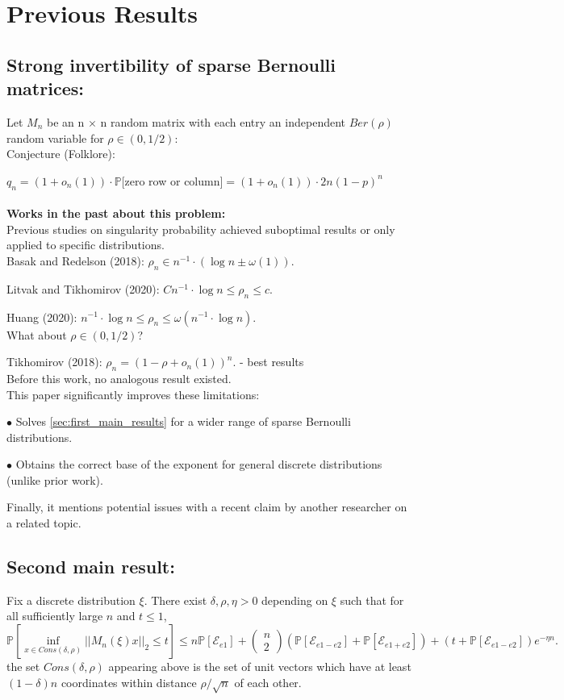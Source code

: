 \documentclass{article}
\begin{document}
\section{Previous Results}
\subsection{Strong invertibility of sparse Bernoulli matrices:}
Let ${M_n}$ be an n $\times$ n random matrix with each entry an independent $Ber(\rho)$ random variable for $\rho \in (0, 1/2)$: \\
Conjecture (Folklore):

$q_n = (1 + o_n(1)) \cdot \mathbb{P}[$zero row or column$] = (1 + o_n(1)) \cdot 2n(1-p)^n$ \\
\\\textbf{Works in the past about this problem:} \\
Previous studies on singularity probability achieved suboptimal results or only applied to specific distributions.\\

Basak and Redelson (2018): ${\rho}_n \in n^{-1} \cdot (\log{n} \pm \omega(1))$.

Litvak and Tikhomirov (2020): ${Cn^{-1} \cdot \log{n} \leq {\rho}_n \leq c}$.

Huang (2020): ${n^{-1} \cdot \log{n} \leq {\rho}_n \leq \omega(n^{-1} \cdot \log{n})}$.\\
What about  $\rho \in (0, 1/2)$?

Tikhomirov (2018): ${\rho}_n = ( 1 - \rho + o_n(1))^n$. - best results \\
Before this work, no analogous result existed.\\
This paper significantly improves these limitations:

$\bullet$ {Solves \ref*{sec:first_main_results} for a wider range of sparse Bernoulli distributions.}

$\bullet$ {Obtains the correct base of the exponent for general discrete distributions (unlike prior work).}

Finally, it mentions potential issues with a recent claim by another researcher on a related topic.

\subsection{Second main result:}
\label{sec:second_main_results}

Fix a discrete distribution $\xi$. There exist $\delta, \rho, \eta > 0$ depending on $\xi$ such that for all sufficiently large $n$ and $t \leq 1$,
$$\mathbb{P}[\inf_{x\in Cons(\delta,\rho)}||M_n(\xi)x||_2\leq t] \leq n\mathbb{P}[\mathcal{E}_{e1}] + \left( \begin{array}{c} n \\ 2 \end{array} \right)(\mathbb{P}[\mathcal{E}_{e1-e2}]+\mathbb{P}[\mathcal{E}_{e1+e2}]) + (t + \mathbb{P}[\mathcal{E}_{e1-e2}])e^{-\eta n}.$$
the set $Cons(\delta,\rho)$ appearing above is the set of unit vectors which have at least $(1-\delta)n$ coordinates within distance $\rho/\sqrt{n}$ of each other.
\end{document}
